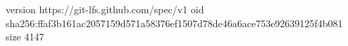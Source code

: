 version https://git-lfs.github.com/spec/v1
oid sha256:ffaf3b161ac2057159d571a58376ef1507d78de46a6ace753e92639125f4b081
size 4147
